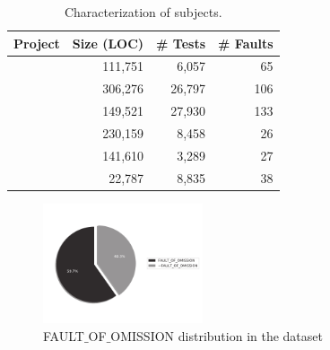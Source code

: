 \documentclass{article}
\begin{document}
\newcommand{\cgray}[1]{\cellcolor{gray!25}#1}
\begin{table}[h]
  \centering
  \setlength{\tabcolsep}{4pt}
    \begin{tabular}{lrrr}
      \toprule
     Project            & Size (LOC) & \# Tests & \# Faults \\ %
      \midrule
      \lang{}            & 111,751  & 6,057 & 65       \\   %
      \cmath{}           & 306,276  & 26,797 & 106     \\   %
      \closure{}         & 149,521  & 27,930  & 133     \\   %
      \chart{}           & 230,159  & 8,458 & 26      \\  %
      \jtime{}           & 141,610  & 3,289 & 27       \\   %
      \mockito{}         & 22,787  & 8,835 & 38    \\     %
      \bottomrule
  \end{tabular}
\caption {Characterization of \dfj{} subjects.}

\label{tab:df4j}
\end{table}
\normalsize

\begin{figure}[h]
	\vspace{-1.5cm}
	
		\centering
		\includegraphics[width=0.42\textwidth]{figures/defects4j.pdf}
		\vspace{-1cm}
		
		\caption{FAULT$\_$OF$\_$OMISSION distribution in the \dfj{} dataset}
		\label{fig:foos}
\end{figure}
\end{document}
